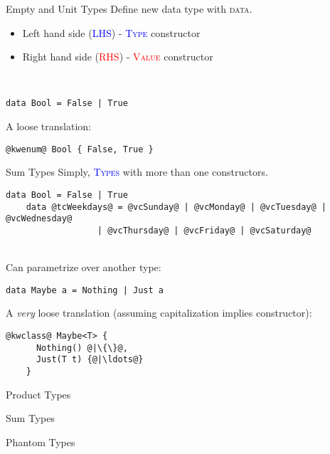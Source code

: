 \documentclass[xcolor={usenames,dvipsnames}]{beamer}
\newcommand{\hkeyword}[1]{\textcolor{TealBlue}{\textsc{#1}}}
\newcommand{\htycon}[1]{\textcolor{Blue}{\textsc{#1}}}
\newcommand{\hvalcon}[1]{\textcolor{Red}{\textsc{#1}}}
\begin{document}
\begin{frame}[fragile]{Empty and Unit Types}
  Define new data type with \hkeyword{data}.
  \begin{itemize}
    \item Left hand side (\htycon{LHS}) - \htycon{Type} constructor
    \item Right hand side (\hvalcon{RHS}) - \hvalcon{Value} constructor
  \end{itemize}

  \ \\
  \begin{lstlisting}[style=hask]
    data Bool = False | True
  \end{lstlisting}

  A loose translation:
  \begin{lstlisting}[style=hask]
    @kwenum@ Bool { False, True }
  \end{lstlisting}
\end{frame}

\begin{frame}[fragile]{Sum Types}
  Simply, \htycon{Types} with more than one constructors.
  \pause
  \begin{lstlisting}[style=hask]
    data Bool = False | True
    data @tcWeekdays@ = @vcSunday@ | @vcMonday@ | @vcTuesday@ | @vcWednesday@
                  | @vcThursday@ | @vcFriday@ | @vcSaturday@
  \end{lstlisting}

  \pause
  \ \\
  Can parametrize over another type:
  \pause
  \begin{lstlisting}[style=hask]
    data Maybe a = Nothing | Just a
  \end{lstlisting}

  A \textit{very} loose translation \tiny{(assuming capitalization implies constructor)}:
  \begin{lstlisting}[style=hask]
    @kwclass@ Maybe<T> {
      Nothing() @|\{\}@,
      Just(T t) {@|\ldots@}
    }
  \end{lstlisting}
\end{frame}

\begin{frame}[fragile]{Product Types}
\end{frame}

\begin{frame}[fragile]{Sum Types}
\end{frame}

\begin{frame}[fragile]{Phantom Types}
\end{frame}
\end{document}
